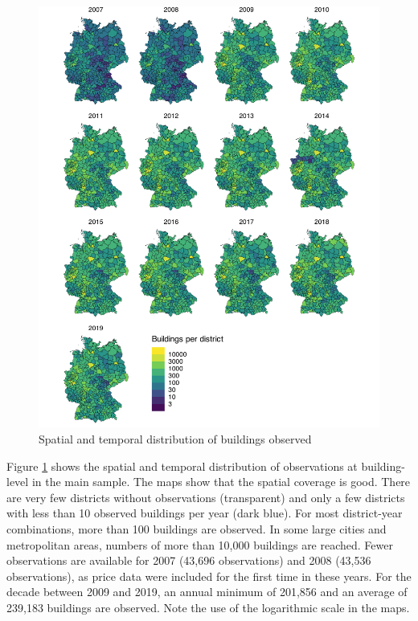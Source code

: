 \documentclass[12pt,twoside]{reedthesis}
\begin{document}
\newpage
\begin{figure}

{\centering \includegraphics[width=0.8\linewidth]{figure/buildings_distribution} 

}

\caption{Spatial and temporal distribution of buildings observed}\label{fig:buildings-distribution}
\end{figure}
Figure \ref{fig:buildings-distribution} shows the spatial and temporal distribution of observations at building-level in the main sample. The maps show that the spatial coverage is good. There are very few districts without observations (transparent) and only a few districts with less than 10 observed buildings per year (dark blue). For most district-year combinations, more than 100 buildings are observed. In some large cities and metropolitan areas, numbers of more than 10,000 buildings are reached. Fewer observations are available for 2007 (43,696 observations) and 2008 (43,536 observations), as price data were included for the first time in these years. For the decade between 2009 and 2019, an annual minimum of 201,856 and an average of 239,183 buildings are observed. Note the use of the logarithmic scale in the maps.
\end{document}
